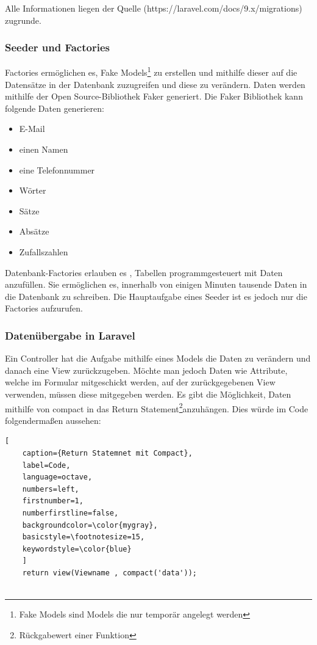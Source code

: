 Alle Informationen liegen der Quelle (https://laravel.com/docs/9.x/migrations) zugrunde.
\newpage
\subsubsection{Seeder und Factories}
Factories ermöglichen es,  Fake Models\footnote{Fake Models sind Models die nur temporär angelegt werden} zu erstellen und mithilfe dieser auf die Datensätze in der Datenbank  zuzugreifen und diese zu verändern. Daten werden mithilfe der Open Source-Bibliothek Faker generiert. Die Faker Bibliothek kann folgende Daten generieren: 



\begin{itemize}
	\item E-Mail 
	\item einen Namen
	\item eine Telefonnummer 
	\item Wörter
	\item Sätze 
	\item Absätze
	\item Zufallszahlen
\end{itemize}

Datenbank-Factories  erlauben es , Tabellen programmgesteuert mit Daten anzufüllen. Sie ermöglichen es, innerhalb von einigen Minuten tausende Daten in die Datenbank zu schreiben.
Die Hauptaufgabe eines Seeder ist es jedoch nur die Factories aufzurufen.

\subsubsection{Datenübergabe in Laravel}
Ein Controller hat die Aufgabe mithilfe eines Models die Daten zu verändern und danach eine View zurückzugeben. Möchte man jedoch Daten wie Attribute, welche im Formular mitgeschickt werden, auf der zurückgegebenen View verwenden, müssen diese mitgegeben werden.
Es gibt die Möglichkeit, Daten mithilfe von compact in das Return Statement\footnote{Rückgabewert einer Funktion}anzuhängen. Dies würde im Code folgendermaßen aussehen: 
\renewcommand{\lstlistingname}{Quellcode}

\begin{lstlisting}[
	caption={Return Statemnet mit Compact},
	label=Code,
	language=octave,
	numbers=left,
	firstnumber=1,
	numberfirstline=false,
	backgroundcolor=\color{mygray},
	basicstyle=\footnotesize=15,
	keywordstyle=\color{blue}
	]
	return view(Viewname , compact('data'));
	
\end{lstlisting}


